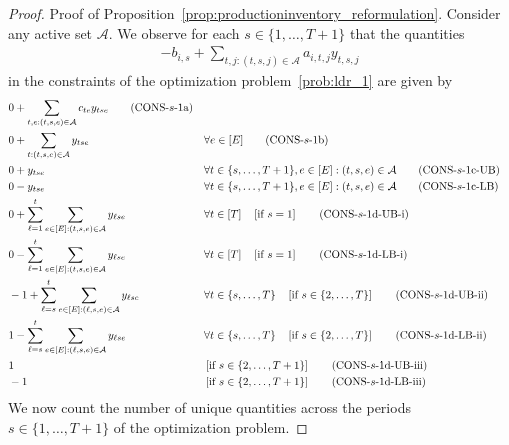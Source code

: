 \documentclass[nonblindrev,mnsc]{informs3} %
\begin{document}
\begin{APPENDICES}
\begin{proof}{Proof of Proposition~\ref{prop:productioninventory_reformulation}.}
Consider any active set $\mathcal{A}$. We observe for each $s \in \{1,\ldots,T+1\}$ that the quantities
\begin{align*}
    - b_{i,s} + \sum_{t,j: (t,s,j) \in \mathcal{A}} a_{i,t,j} y_{t,s,j}
\end{align*}
in the constraints of the optimization problem~\eqref{prob:ldr_1} are given by %
\begin{align}
    &0 + \sum_{t,e: (t,s,e) \in \mathcal{A}} c_{te} y_{tse} \label{cons:1a} \tag{CONS-$s$-1a} \\
    &0 + \sum_{t: (t,s,e) \in \mathcal{A}}  y_{tse} && \forall e \in [E] \label{cons:1b} \tag{CONS-$s$-1b} \\
    &0 + y_{tse} && \forall t \in \{s,\ldots,T+1\}, e \in [E]: (t,s,e) \in \mathcal{A} \label{cons:1c-UB} \tag{CONS-$s$-1c-UB}\\
    &0 - y_{tse} && \forall t \in \{s,\ldots,T+1\}, e \in [E]: (t,s,e) \in \mathcal{A}\label{cons:1c-LB} \tag{CONS-$s$-1c-LB}\\
    &0 + \sum_{\ell=1}^t \sum_{e \in [E]: (t,s,e) \in \mathcal{A}} y_{\ell s e} && \forall t \in [T] \quad \left[ \textnormal{if } s = 1 \right]\label{cons:1d-UB-i} \tag{CONS-$s$-1d-UB-i}\\
     &0 - \sum_{\ell=1}^t \sum_{e \in [E]: (t,s,e) \in \mathcal{A}} y_{\ell s e} && \forall t \in [T] \quad \left[ \textnormal{if } s = 1 \right] \label{cons:1d-LB-i} \tag{CONS-$s$-1d-LB-i} \\
    &-1 + \sum_{\ell=s}^t \sum_{e \in [E]: (\ell,s,e) \in \mathcal{A}} y_{\ell se} && \forall t \in \{s,\ldots,T\} \quad \left[ \textnormal{if } s \in \{2,\ldots,T\} \right] \label{cons:1d-UB-ii} \tag{CONS-$s$-1d-UB-ii}\\
    &1 - \sum_{\ell=s}^t \sum_{e \in [E]: (\ell,s,e) \in \mathcal{A}} y_{\ell se} && \forall t \in \{s,\ldots,T\} \quad \left[ \textnormal{if } s \in \{2,\ldots,T\} \right] \label{cons:1d-LB-ii} \tag{CONS-$s$-1d-LB-ii} \\
    &1 && \left[\textnormal{if } s \in \{2,\ldots,T+1 \} \right] \label{cons:1d-UB-iii} \tag{CONS-$s$-1d-UB-iii} \\
     &-1 && \left[\textnormal{if } s \in \{2,\ldots,T+1 \} \right]\label{cons:1d-LB-iii} \tag{CONS-$s$-1d-LB-iii}
\end{align}
We now count the number of unique quantities across the periods $s \in \{1,\ldots,T+1\}$ of the optimization problem.

\end{proof}
\end{APPENDICES}
\end{document}
